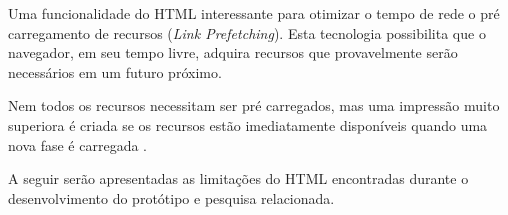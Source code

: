 Uma funcionalidade do HTML interessante para otimizar o tempo de rede
o pré carregamento de recursos (\textit{Link Prefetching}). Esta
tecnologia possibilita que o navegador, em seu tempo livre, adquira
recursos que provavelmente serão necessários em um futuro próximo.

Nem todos os recursos necessitam ser pré carregados, mas uma impressão
muito superiora é criada se os recursos estão imediatamente
disponíveis quando uma nova fase é carregada \autocite[p. 39]{creatingFun}.

A seguir serão apresentadas as limitações do HTML encontradas durante
o desenvolvimento do protótipo e pesquisa relacionada.

